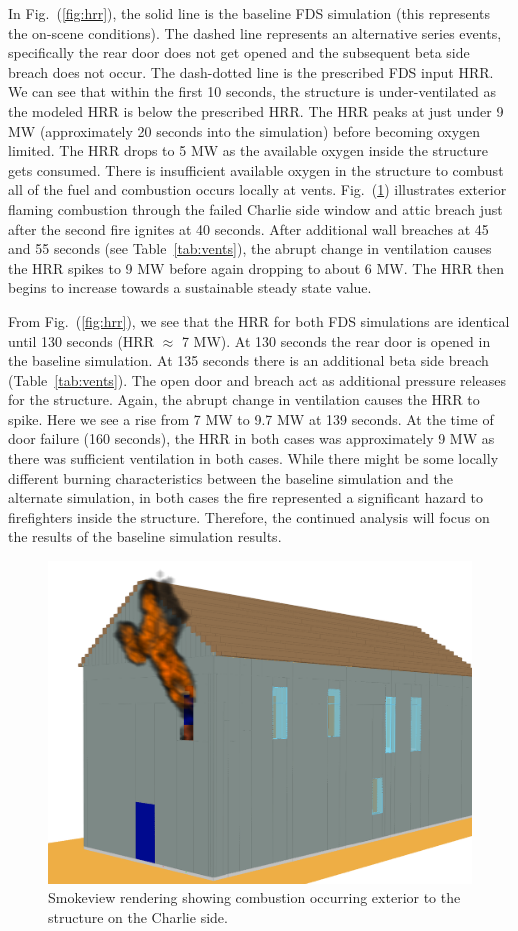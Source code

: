 \documentclass[11pt,oneside]{book}
\begin{document}
In Fig.~(\ref{fig:hrr}), the solid line is the baseline FDS simulation (this represents the on-scene conditions). The dashed line represents an alternative series events, specifically the rear door does not get opened and the subsequent beta side breach does not occur. The dash-dotted line is the prescribed FDS input HRR. We can see that within the first 10 seconds, the structure is under-ventilated as the modeled HRR is below the prescribed HRR. The HRR peaks at just under 9 MW (approximately 20 seconds into the simulation) before becoming oxygen limited. The HRR drops to 5 MW as the available oxygen inside the structure gets consumed. There is insufficient available oxygen in the structure to combust all of the fuel and combustion occurs locally at vents. Fig.~(\ref{fig:smv_ext_fire}) illustrates exterior flaming combustion through the failed Charlie side window and attic breach just after the second fire ignites at 40 seconds. After additional wall breaches at 45 and 55 seconds (see Table~\ref{tab:vents}), the abrupt change in ventilation causes the HRR spikes to 9 MW before again dropping to about 6 MW. The HRR then begins to increase towards a sustainable steady state value.

From Fig.~(\ref{fig:hrr}), we see that the HRR for both FDS simulations are identical until 130 seconds (HRR $\approx$ 7 MW). At 130 seconds the rear door is opened in the baseline simulation. At 135 seconds there is an additional beta side breach (Table~\ref{tab:vents}). The open door and breach act as additional pressure releases for the structure. Again, the abrupt change in ventilation causes the HRR to spike. Here we see a rise from 7 MW to 9.7 MW at 139 seconds. At the time of door failure (160 seconds), the HRR in both cases was approximately 9 MW as there was sufficient ventilation in both cases. While there might be some locally different burning characteristics between the baseline simulation and the alternate simulation, in both cases the fire represented a significant hazard to firefighters inside the structure. Therefore, the continued analysis will focus on the results of the baseline simulation results.

\begin{figure}[h!]
\centering
\includegraphics[width=.675\textwidth]{../Figures/smv_exterior_fire}
\caption{Smokeview rendering showing combustion occurring exterior to the structure on the Charlie side.}
\label{fig:smv_ext_fire}
\end{figure}
\end{document}
